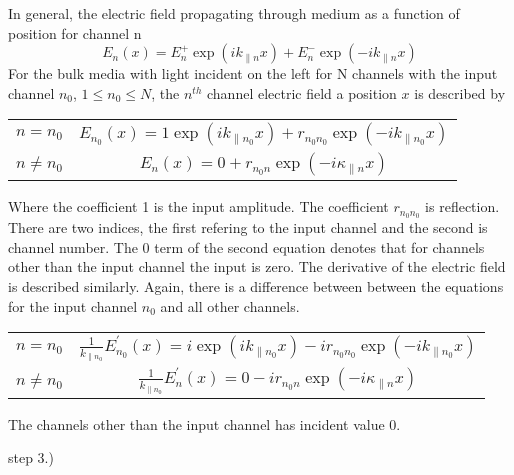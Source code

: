In general, the electric field propagating through medium as a function of position for channel n
\begin{equation}
E_n(x) = E_n^+ \exp(i k_{\parallel n} x) + E_n^- \exp(-i k_{\parallel n} x) 
\end{equation}
For the bulk media with light incident on the left for N channels with the input channel $n_0$, $ 1 \leq n_0 \leq N$, the $n^{th}$ channel electric field a position $x$ is described by
\begin{center}
\begin{tabular}{cc}
$n = n_0$ \quad \quad \quad & $ E_{n_0}(x) = 1 \exp(i k_{\parallel n_0} x) + r_{n_0n_0} \exp(-i k_{\parallel n_0} x) $ \\
$n \ne n_0$  \quad \quad \quad & $ E_n(x) = 0 + r_{n_0n} \exp(-i \kappa_{\parallel n} x) $ \\
\end{tabular}
\end{center}
Where the coefficient 1 is the input amplitude. The coefficient $r_{n_0n_0}$ is reflection.  There are two indices, the first refering to the input channel and the second is channel number. The 0 term of the second equation denotes that for channels other than the input channel the input is zero.
The derivative of the electric field is described similarly. Again, there is a difference between between the equations for the input channel $n_0$ and all other channels.
\begin{center}
\begin{tabular}{cc}
$n = n_0$ \quad \quad \quad & $ \frac{1}{k_{\parallel n_0}} E_{n_0}^{\prime}(x) = i \exp(i k_{\parallel n_0} x) - i r_{n_0n_0} \exp(-i k_{\parallel n_0} x) $ \\
$n \ne n_0$  \quad \quad \quad & $ \frac{1}{k_{\parallel n_0}} E_n^{\prime}(x) = 0 -i r_{n_0n} \exp(-i \kappa_{\parallel n} x) $ \\
\end{tabular}
\end{center}
The channels other than the input channel has incident value 0.


step 3.)

